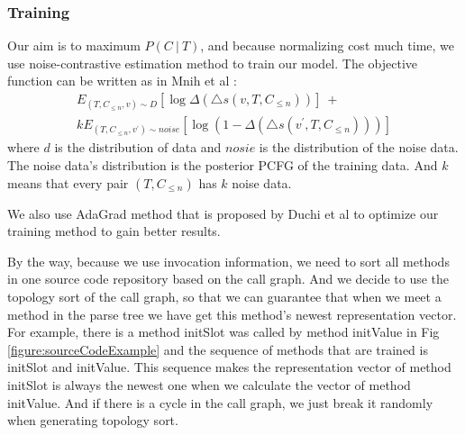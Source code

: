 \subsubsection{Training}
Our aim is to maximum $P(C\ |\ T)$, and because normalizing cost much time, we use noise-contrastive estimation method \cite{gutmann2012noise} to train our model. The objective function can be written as in Mnih et al \cite{mnih2013learning}:
\begin{align}
  \nonumber  E_{(T,C_{\leq n},v)\sim D}[\log\Delta(\triangle s(v,T,C_{\leq n}))]\ +\ \\ kE_{(T,C_{\leq n},v^{'})\sim noise}[\log(1-\Delta(\triangle s(v^{'},T,C_{\leq n})))]
\end{align}
where $d$ is the distribution of data and $nosie$ is the distribution of the noise data. The noise data's distribution is the posterior PCFG of the training data. And $k$ means that every pair $(T,C_{\leq n})$ has $k$ noise data.

We also use AdaGrad method that is proposed by Duchi et al \cite{duchi2011adaptive} to optimize our training method to gain better results.

By the way, because we use invocation information, we need to sort all methods in one source code repository based on the call graph. And we decide to use the topology sort of the call graph, so that we can guarantee that when we meet a method in the parse tree we have get this method's newest representation vector. For example, there is a method initSlot was called by method initValue in Fig \ref{figure:sourceCodeExample}
and the sequence of methods that are trained is initSlot and initValue. This sequence makes the representation vector of method initSlot is always the newest one when we calculate the vector of method initValue. And if there is a cycle in the call graph, we just break it randomly when generating topology sort.
